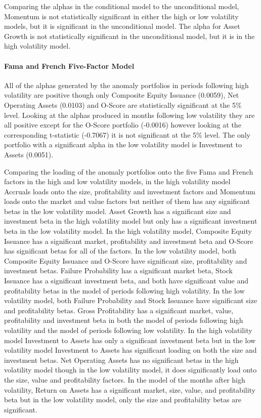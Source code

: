 \documentclass[a4paper,12pt]{article}                 %
\begin{document}
Comparing the alphas in the conditional model to the unconditional model, Momentum is not statistically significant in either the high or low volatility models, but it is significant in the unconditional model. The alpha for Asset Growth is not statistically significant in the unconditional model, but it is in the high volatility model.

\paragraph{Fama and French Five-Factor Model}
All of the alphas generated by the anomaly portfolios in periods following high volatility are positive though only Composite Equity Issuance (0.0059), Net Operating Assets (0.0103) and O-Score are statistically significant at the 5\% level. Looking at the alphas produced in months following low volatility they are all positive except for the O-Score portfolio (-0.0016) however looking at the corresponding t-statistic (-0.7067) it is not significant at the 5\% level. The only portfolio with a significant alpha in the low volatility model is Investment to Assets (0.0051).

Comparing the loading of the anomaly portfolios onto the five Fama and French factors in the high and low volatility models, in the high volatility model Accruals loads onto the size, profitability and investment factors and Momentum loads onto the market and value factors but neither of them has any significant betas in the low volatility model. Asset Growth has a significant size and investment beta in the high volatility model but only has a significant investment beta in the low volatility model. In the high volatility model, Composite Equity Issuance has a significant market, profitability and investment beta and O-Score has significant betas for all of the factors. In the low volatility model, both Composite Equity Issuance and O-Score have significant size, profitability and investment betas. Failure Probability has a significant market beta, Stock Issuance has a significant investment beta, and both have significant value and profitability betas in the model of periods following high volatility. In the low volatility model, both Failure Probability and Stock Issuance have significant size and profitability betas. Gross Profitability has a significant market, value, profitability and investment beta in both the model of periods following high volatility and the model of periods following low volatility. In the high volatility model Investment to Assets has only a significant investment beta but in the low volatility model Investment to Assets has significant loading on both the size and investment betas. Net Operating Assets has no significant betas in the high volatility model though in the low volatility model, it does significantly load onto the size, value and profitability factors. In the model of the months after high volatility, Return on Assets has a significant market, size, value, and profitability beta but in the low volatility model, only the size and profitability betas are significant. 
\end{document}
